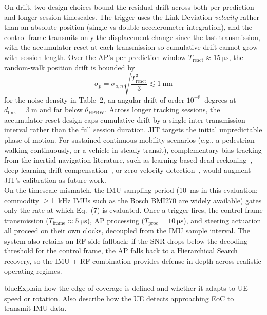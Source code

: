 \documentclass{article}
\newcommand{\blue}[1]{\begin{color}{blue}#1\end{color}}
\begin{document}
\noindent On drift, two design choices bound the residual drift across both per-prediction and longer-session timescales. The trigger uses the Link Deviation \emph{velocity} rather than an absolute position (single vs double accelerometer integration), and the control frame transmits only the displacement change since the last transmission, with the accumulator reset at each transmission so cumulative drift cannot grow with session length. Over the AP's per-prediction window $T_{\text{react}} \approx \SI{15}{\micro\second}$, the random-walk position drift is bounded by
\begin{equation}
    \sigma_p = \sigma_{a,n}\sqrt{\frac{T_{\text{react}}^{3}}{3}} \lesssim \SI{1}{\nano\meter}
\end{equation}
for the noise density in Table~2, an angular drift of order $10^{-8}$~degrees at $d_{\text{link}} = \SI{3}{\meter}$ and far below $\theta_{\text{HPBW}}$. Across longer tracking sessions, the accumulator-reset design caps cumulative drift by a single inter-transmission interval rather than the full session duration. JIT targets the initial unpredictable phase of motion. For sustained continuous-mobility scenarios (e.g., a pedestrian walking continuously, or a vehicle in steady transit), complementary bias-tracking from the inertial-navigation literature, such as learning-based dead-reckoning~\cite{Brossard2020AIIMU}, deep-learning drift compensation~\cite{Chen2024DLInertial}, or zero-velocity detection~\cite{Skog2010ZUPT}, would augment JIT's calibration as future work.\\

\noindent On the timescale mismatch, the IMU sampling period (\SI{10}{\milli\second} in this evaluation; commodity $\geq$\SI{1}{\kilo\hertz} IMUs such as the Bosch BMI270 are widely available) gates only the rate at which Eq.~(7) is evaluated. Once a trigger fires, the control-frame transmission ($T_{\text{frame}} \approx \SI{5}{\micro\second}$), AP processing ($T_{\text{proc}} = \SI{10}{\micro\second}$), and steering actuation all proceed on their own clocks, decoupled from the IMU sample interval. The system also retains an RF-side fallback: if the SNR drops below the decoding threshold for the control frame, the AP falls back to a Hierarchical Search recovery, so the IMU + RF combination provides defense in depth across realistic operating regimes.

\begin{tcbremark}
{\selectfont
\blue{Explain how the edge of coverage is defined and whether it adapts to UE speed or rotation. Also describe how the UE detects approaching EoC to transmit IMU data.}
}
\end{tcbremark}
\end{document}
